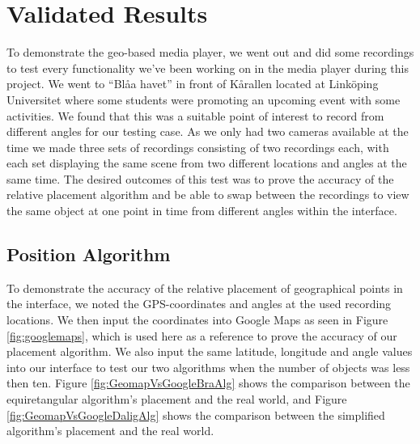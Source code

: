 \chapter{Validated Results}
\label{cha:results}

To demonstrate the geo-based media player, we went out and did some recordings to test every functionality we’ve been working on in the media player during this project. We went to “Blåa havet” in front of Kårallen located at Linköping Universitet where some students were promoting an upcoming event with some activities. We found that this was a suitable point of interest to record from different angles for our testing case. As we only had two cameras available at the time we made three sets of recordings consisting of two recordings each, with each set displaying the same scene from two different locations and angles at the same time. The desired outcomes of this test was to prove the accuracy of the relative placement algorithm and be able to swap between the recordings to view the same object at one point in time from different angles within the interface.

\section{Position Algorithm}
\label{sec:positionalgorithm}

To demonstrate the accuracy of the relative placement of geographical points in the interface, we noted the GPS-coordinates and angles at the used recording locations. We then input the coordinates into Google Maps as seen in Figure \ref{fig:googlemaps}, which is used here as a reference to prove the accuracy of our placement algorithm. We also input the same latitude, longitude and angle values into our interface to test our two algorithms when the number of objects was less then ten. Figure \ref{fig:GeomapVsGoogleBraAlg} shows the comparison between the equiretangular algorithm's placement and the real world, and Figure \ref{fig:GeomapVsGoogleDaligAlg} shows the comparison between the simplified algorithm's placement and the real world. 



